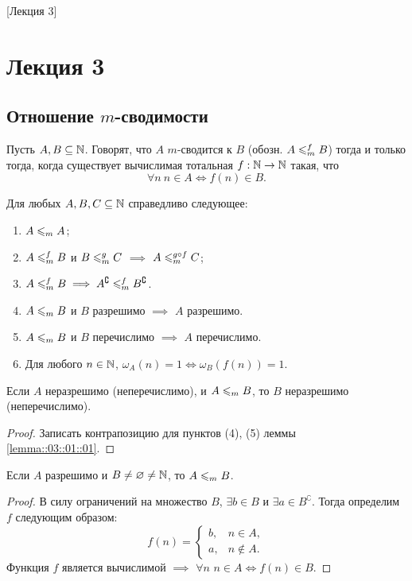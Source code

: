 [Лекция 3]
\newpage

\section{Лекция 3}

\subsection{Отношение $m$-сводимости}

\begin{definition}
    Пусть $A, B \subseteq \mathbb{N}$.
    Говорят, что $A$ $m$-сводится к $B$ (обозн. $A \leqslant_{m}^{f} B$) тогда и только тогда, когда существует вычислимая тотальная $f: \mathbb{N} \to \mathbb{N}$ такая, что
    $$
        \forall n~ n \in A \iff f(n) \in B.
    $$
\end{definition}

\begin{lemma} \label{lemma::03::01::01}
    Для любых $A, B, C \subseteq \mathbb{N}$ справедливо следующее:
    \begin{enumerate}
        \item $A \leqslant_{m} A$;
        \item $A \leqslant_{m}^{f} B$ и $B \leqslant_{m}^{g} C$ $\implies$ $A \leqslant_{m}^{g \circ f} C$;
        \item $A \leqslant_{m}^{f} B \implies A^{\complement} \leqslant_{m}^{f} B^{\complement}$.
        \item $A \leqslant_{m} B$ и $B$ разрешимо $\implies$ $A$ разрешимо.
        \item $A \leqslant_{m} B$ и $B$ перечислимо $\implies$ $A$ перечислимо.
        \item Для любого $n \in \mathbb{N}$, $\omega_{A}\left(n\right) = 1 \iff \omega_{B}\left(f\left(n\right)\right) = 1$.
    \end{enumerate}
\end{lemma}

\begin{corollary}
    Если $A$ неразрешимо (неперечислимо), и $A \leqslant_{m} B$, то $B$ неразрешимо (неперечислимо).
\end{corollary}
\begin{proof}
    Записать контрапозицию для пунктов (4), (5) леммы \ref{lemma::03::01::01}.
\end{proof}

\begin{statement}
    Если $A$ разрешимо и $B \neq \varnothing \neq \mathbb{N}$, то $A \leqslant_{m} B$.
\end{statement}
\begin{proof}
    В силу ограничений на множество $B$, $\exists b \in B$ и $\exists a \in B^{\complement}$.
    Тогда определим $f$ следующим образом:
    $$
        f\left(n\right) = \begin{cases}
            b, & n \in A, \\
            a, & n \notin A.
        \end{cases}
    $$
    Функция $f$ является вычислимой $\implies$ $\forall n$ $n \in A \iff f(n) \in B$.
\end{proof}

